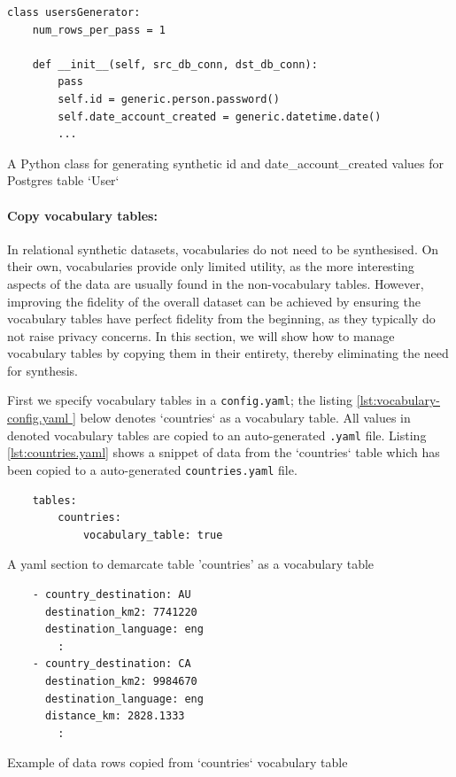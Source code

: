 \documentclass[11pt]{article}
\begin{document}
\begin{listing}[H]
\begin{verbatim}
class usersGenerator:
    num_rows_per_pass = 1

    def __init__(self, src_db_conn, dst_db_conn):
        pass
        self.id = generic.person.password()
        self.date_account_created = generic.datetime.date()
        ...
\end{verbatim}
\caption{A Python class for generating synthetic id and date\_account\_created values for Postgres table `User`}
\label{lst:ssg.py}
\end{listing}

\paragraph{Copy vocabulary tables:}

In relational synthetic datasets, vocabularies do not need to be synthesised. On their own, vocabularies provide only limited utility, as the more interesting aspects of the data are usually found in the non-vocabulary tables. However, improving the fidelity of the overall dataset can be achieved by ensuring the vocabulary tables have perfect fidelity from the beginning, as they typically do not raise privacy concerns. In this section, we will show how to manage vocabulary tables by copying them in their entirety, thereby eliminating the need for synthesis.

First we specify vocabulary tables in a \texttt{config.yaml}; the listing \ref{lst:vocabulary-config.yaml } below denotes `countries` as a vocabulary table. All values in denoted vocabulary tables are copied to an auto-generated \texttt{.yaml} file. Listing \ref{lst:countries.yaml} shows a snippet of data from the `countries` table which has been copied to a auto-generated \texttt{countries.yaml} file.

\begin{listing}[H]
\begin{verbatim}
    tables:
        countries:
            vocabulary_table: true
\end{verbatim}
\caption{A yaml section to demarcate table 'countries' as a vocabulary table}
\label{lst:vocabulary-config.yaml }
\end{listing}

\begin{listing}[H]
\begin{verbatim}
    - country_destination: AU
      destination_km2: 7741220
      destination_language: eng
        :
    - country_destination: CA
      destination_km2: 9984670
      destination_language: eng
      distance_km: 2828.1333
        :
\end{verbatim}
\caption{Example of data rows copied from `countries` vocabulary table}
\label{lst:countries.yaml}
\end{listing}
\end{document}
